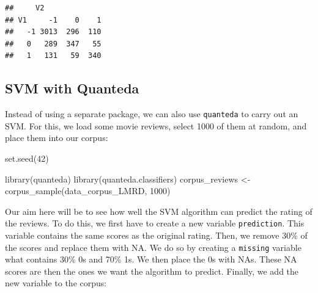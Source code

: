 \documentclass[
]{book}
\newenvironment{Shaded}{\begin{snugshade}}{\end{snugshade}}
\newcommand{\ConstantTok}[1]{\textcolor[rgb]{0.00,0.00,0.00}{#1}}
\newcommand{\DecValTok}[1]{\textcolor[rgb]{0.00,0.00,0.81}{#1}}
\newcommand{\FloatTok}[1]{\textcolor[rgb]{0.00,0.00,0.81}{#1}}
\newcommand{\FunctionTok}[1]{\textcolor[rgb]{0.00,0.00,0.00}{#1}}
\newcommand{\NormalTok}[1]{#1}
\newcommand{\OtherTok}[1]{\textcolor[rgb]{0.56,0.35,0.01}{#1}}
\newcommand{\SpecialCharTok}[1]{\textcolor[rgb]{0.00,0.00,0.00}{#1}}
\newcommand{\StringTok}[1]{\textcolor[rgb]{0.31,0.60,0.02}{#1}}
\begin{document}
\begin{verbatim}
##     V2
## V1     -1    0    1
##   -1 3013  296  110
##   0   289  347   55
##   1   131   59  340
\end{verbatim}

\hypertarget{svm-with-quanteda}{%
\subsection{SVM with Quanteda}\label{svm-with-quanteda}}

Instead of using a separate package, we can also use \texttt{quanteda} to carry out an SVM. For this, we load some movie reviews, select 1000 of them at random, and place them into our corpus:

\begin{Shaded}
\begin{Highlighting}[]
\FunctionTok{set.seed}\NormalTok{(}\DecValTok{42}\NormalTok{)}

\FunctionTok{library}\NormalTok{(quanteda)}
\FunctionTok{library}\NormalTok{(quanteda.classifiers)}
\NormalTok{corpus\_reviews }\OtherTok{\textless{}{-}} \FunctionTok{corpus\_sample}\NormalTok{(data\_corpus\_LMRD, }\DecValTok{1000}\NormalTok{)}
\end{Highlighting}
\end{Shaded}

Our aim here will be to see how well the SVM algorithm can predict the rating of the reviews. To do this, we first have to create a new variable \texttt{prediction}. This variable contains the same scores as the original rating. Then, we remove 30\% of the scores and replace them with NA. We do so by creating a \texttt{missing} variable what contains 30\% 0s and 70\% 1s. We then place the 0s with NAs. These NA scores are then the ones we want the algorithm to predict. Finally, we add the new variable to the corpus:

\begin{Shaded}
\end{Shaded}
\end{document}
